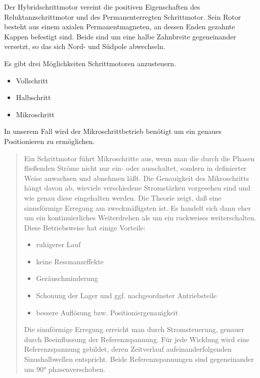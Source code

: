 Der Hybridschrittmotor vereint die positiven Eigenschaften des Reluktanzschrittmotor und des Permanenterregten Schrittmotor. Sein Rotor besteht aus einem axialen Permanentmagneten, an dessen Enden gezahnte Kappen befestigt sind. Beide sind um eine halbe Zahnbreite gegeneinander versetzt, so das sich Nord- und Südpole abwechseln.

Es gibt drei Möglichkeiten Schrittmotoren anzusteuern.
\begin{itemize}
	\item Vollschritt
	\item Halbschritt
	\item Mikroschritt
\end{itemize}

In unserem Fall wird der Mikroschrittbetrieb benötigt um ein genaues Positionieren zu ermöglichen.

\begin{quote}

Ein Schrittmotor führt Mikroschritte aus, wenn man die durch die Phasen fließenden Ströme nicht nur ein- oder ausschaltet, sondern in definierter Weise anwachsen und abnehmen läßt. Die Genauigkeit des Mikroschritts hängt davon ab, wieviele verschiedene Stromstärken vorgesehen sind und wie genau diese eingehalten werden. Die Theorie zeigt, daß eine sinusförmige Erregung am zweckmäßigsten ist. Es handelt sich dann eher um ein kontinuierliches Weiterdrehen als um ein ruckweises weiterschalten. Diese Betriebsweise hat einige Vorteile:
\begin{itemize}
	\item ruhigerer Lauf
	\item keine Resonanzeffekte
	\item Geräuschminderung
	\item Schonung der Lager und ggf. nachgeordneter Antriebsteile
	\item bessere Auflösung bzw. Positioniergenauigkeit
\end{itemize}

Die sinuförmige Erregung erreicht man durch Stromsteuerung, genauer durch Beeinflussung der Referenzspannung. Für jede Wicklung wird eine Referenzspannung gebildet, deren Zeitverlauf aufeinanderfolgenden Sinushalbwellen  entspricht. Beide Referenzspannungen sind gegeneinander um 90° phasenverschoben.

\end{quote}

\newpage
